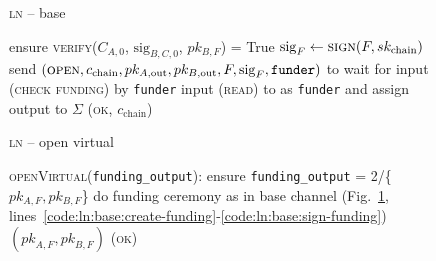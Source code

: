 \begin{figure}[H]
\begin{processbox}{\textsc{ln} -- base}
\begin{algorithmic}[1]
          \State {}
          \State {}
          \State {}
          \State {}
          \State {}
          \State ensure \textsc{verify}($C_{A, 0}$, $\mathrm{sig}_{B, C, 0}$,
          $pk_{B, F}$) = True
        \EndIf
        \State $\mathrm{sig}_F \gets \textsc{sign}(F, sk_{\mathrm{chain}})$
        \label{code:ln:base:sign-funding}
        \State send $(\textsc{open}, c_{\mathrm{chain}}, pk_{A, \mathrm{out}},
        pk_{B, \mathrm{out}}, F, \mathrm{sig}_F, \texttt{funder})$ to \adversary
          \State wait for input (\textsc{check funding}) by \texttt{funder}
          \State input (\textsc{read}) to \ledger as \texttt{funder} and assign
          output to $\Sigma$
        \EndWhile
        \State \Return (\textsc{ok}, $c_{\mathrm{chain}}$)
      \EndIndent
    \end{algorithmic}
  \end{processbox}
  \caption{}
  \label{code:ln:base}
\end{figure}

\begin{figure}[H]
  \begin{processbox}{\textsc{ln} -- open virtual}
    \begin{algorithmic}[1]
      \State \textsc{openVirtual}(\texttt{funding\_output}): 
      \Indent
        \State ensure \texttt{funding\_output} = 2/\{$pk_{A, F}, pk_{B, F}$\}
          \State do funding ceremony as in base channel
          (Fig.~\ref{code:ln:base},
          lines~\ref{code:ln:base:create-funding}-\ref{code:ln:base:sign-funding})
          \State \Return $(\textit{pk}_{A, F}, \textit{pk}_{B, F})$
        \EndIf
        \State \Return (\textsc{ok})
      \EndIndent
    \end{algorithmic}
  \end{processbox}
  \caption{}
  \label{code:ln:open-virtual}
\end{figure}

